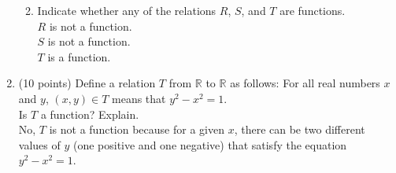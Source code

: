 \documentclass{article}
\begin{document}
\begin{enumerate}
\begin{enumerate}
        \vspace{1em}
        
        \hrulefill

        \item Indicate whether any of the relations $R$, $S$, and $T$ are functions.\\
        \vspace{1em}
        $R$ is not a function.\\
        $S$ is not a function.\\
        $T$ is a function.
        \vspace{1em}
    \end{enumerate}
    
    \hrulefill

    \item (10 points) Define a relation $T$ from $\mathbb{R}$ to $\mathbb{R}$ as follows: For all real numbers $x$ and $y$,
    $(x, y) \in T$ means that $y^2 - x^2 = 1$.\\
    \vspace{1em}
    Is $T$ a function? Explain.\\
    \vspace{1em}
    No, $T$ is not a function because for a given $x$, there can be two different values of $y$ (one positive and one negative) that satisfy the equation $y^2 - x^2 = 1$.
    \vspace{1em}

\end{enumerate}
\end{document}
